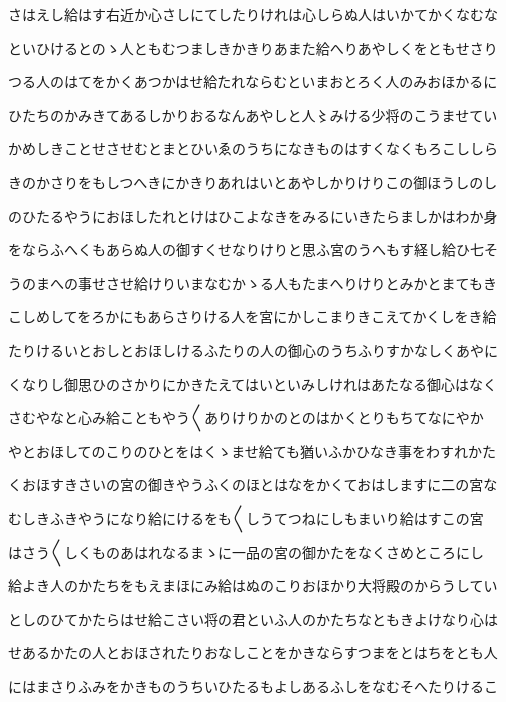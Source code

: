 \documentclass[a4paper,11pt,landscape]{ltjtarticle}
\begin{document}
\par\medskip
さはえし給はす右近か心さしにてしたりけれは心しらぬ人はいかてかくなむな
\par\medskip
といひけるとのゝ人ともむつましきかきりあまた給へりあやしくをともせさり
\par\medskip
つる人のはてをかくあつかはせ給たれならむといまおとろく人のみおほかるに
\par\medskip
ひたちのかみきてあるしかりおるなんあやしと人〻みける少将のこうませてい
\par\medskip
かめしきことせさせむとまとひいゑのうちになきものはすくなくもろこししら
\par\medskip
きのかさりをもしつへきにかきりあれはいとあやしかりけりこの御ほうしのし
\par\medskip
のひたるやうにおほしたれとけはひこよなきをみるにいきたらましかはわか身
\par\medskip
をならふへくもあらぬ人の御すくせなりけりと思ふ宮のうへもす経し給ひ七そ
\par\medskip
うのまへの事せさせ給けりいまなむかゝる人もたまへりけりとみかとまてもき
\par\medskip
こしめしてをろかにもあらさりける人を宮にかしこまりきこえてかくしをき給
\par\medskip
たりけるいとおしとおほしけるふたりの人の御心のうちふりすかなしくあやに
\par\medskip
くなりし御思ひのさかりにかきたえてはいといみしけれはあたなる御心はなく
\par\medskip
さむやなと心み給こともやう〱ありけりかのとのはかくとりもちてなにやか
\par\medskip
やとおほしてのこりのひとをはくゝませ給ても猶いふかひなき事をわすれかた
\par\medskip
くおほすきさいの宮の御きやうふくのほとはなをかくておはしますに二の宮な
\par\medskip
むしきふきやうになり給にけるをも〱しうてつねにしもまいり給はすこの宮
\par\medskip
はさう〱しくものあはれなるまゝに一品の宮の御かたをなくさめところにし
\par\medskip
給よき人のかたちをもえまほにみ給はぬのこりおほかり大将殿のからうしてい
\par\medskip
としのひてかたらはせ給こさい将の君といふ人のかたちなともきよけなり心は
\par\medskip
せあるかたの人とおほされたりおなしことをかきならすつまをとはちをとも人
\par\medskip
にはまさりふみをかきものうちいひたるもよしあるふしをなむそへたりけるこ
\par\medskip
\end{document}
